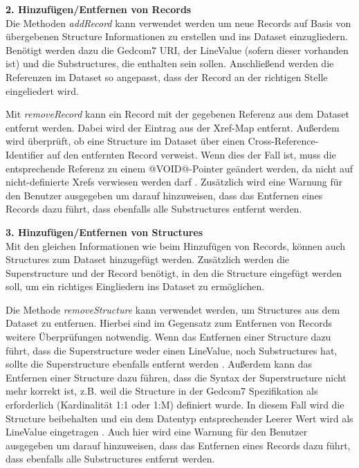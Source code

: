\vspace{1em}
\textbf{2. Hinzufügen/Entfernen von Records} \vspace{0.5em} \\
Die Methoden \textit{addRecord} kann verwendet werden um neue Records auf Basis von übergebenen Structure Informationen zu erstellen und ins Dataset einzugliedern. Benötigt werden dazu die Gedcom7 URI, der LineValue (sofern dieser vorhanden ist) und die Substructures, die enthalten sein sollen. Anschließend werden die Referenzen im Dataset so angepasst, dass der Record an der richtigen Stelle eingeliedert wird.


Mit \textit{removeRecord} kann ein Record mit der gegebenen Referenz aus dem Dataset entfernt werden. Dabei wird der Eintrag aus der Xref-Map entfernt. Außerdem wird überprüft, ob eine Structure im Dataset über einen Cross-Reference-Identifier auf den entfernten Record verweist. Wenn dies der Fall ist, muss die entsprechende Referenz zu einem @VOID@-Pointer geändert werden, da nicht auf nicht-definierte Xrefs verwiesen werden darf \cite{GEDCOM}. Zusätzlich wird eine Warnung für den Benutzer ausgegeben um darauf hinzuweisen, dass das Entfernen eines Records dazu führt, dass ebenfalls alle Substructures entfernt werden. 


\vspace{1em}
\textbf{3. Hinzufügen/Entfernen von Structures} \vspace{0.5em} \\
Mit den gleichen Informationen wie beim Hinzufügen von Records, können auch Structures zum Dataset hinzugefügt werden. Zusätzlich werden die Superstructure und der Record benötigt, in den die Structure eingefügt werden soll, um ein richtiges Eingliedern ins Dataset zu ermöglichen. 


Die Methode \textit{removeStructure} kann verwendet werden, um Structures aus dem Dataset zu entfernen. Hierbei sind im Gegensatz zum Entfernen von Records weitere Überprüfungen notwendig. Wenn das Entfernen einer Structure dazu führt, dass die Superstructure weder einen LineValue, noch Substructures hat, sollte die Superstructure ebenfalls entfernt werden \cite{GEDCOM}. Außerdem kann das Entfernen einer Structure dazu führen, dass die Syntax der Superstructure nicht mehr korrekt ist, z.B. weil die Structure in der Gedcom7 Spezifikation als erforderlich (Kardinalität 1:1 oder 1:M) definiert wurde. In diesem Fall wird die Structure beibehalten und ein dem Datentyp entsprechender Leerer Wert wird als LineValue eingetragen \cite{GEDCOM}. Auch hier wird eine Warnung für den Benutzer ausgegeben um darauf hinzuweisen, dass das Entfernen eines Records dazu führt, dass ebenfalls alle Substructures entfernt werden. 

